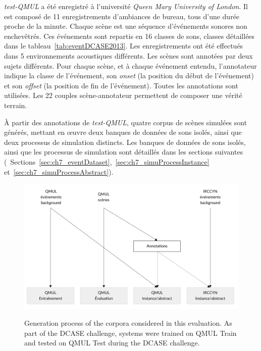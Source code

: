 \emph{test-QMUL} a été enregistré à l'université \emph{Queen Mary University of London}. Il est composé de 11 enregistrements d'ambiances de bureau, tous d'une durée proche de la minute. Chaque scène est une séquence d'événements sonores non enchevêtrés. Ces événements sont repartis en 16 classes de sons, classes détaillées dans le tableau~\ref{tab:eventDCASE2013}. Les enregistrements ont été effectués dans 5 environnements acoustiques différents. Les scènes sont annotées par deux sujets différents. Pour chaque scène, et à chaque événement entendu, l'annotateur indique la classe de l'événement, son \emph{onset} (la position du début de l'événement) et son \emph{offset} (la position de fin de l'événement). Toutes les annotations sont utilisées. Les 22 couples scène-annotateur permettent de composer une vérité terrain.

À partir des annotations de \emph{test-QMUL}, quatre corpus de scènes simulées sont générés, mettant en œuvre deux banques de données de sons isolés, ainsi que deux processus de simulation distincts. Les banques de données de sons isolés, ainsi que les processus de simulation sont détaillés dans les sections suivantes (\cf~Sections~\ref{sec:ch7_eventDataset},~\ref{sec:ch7_simuProcessInstance} et~\ref{sec:ch7_simuProcessAbstract}). 

\begin{figure}[t]
\begin{center}
\includegraphics[width=1\textwidth]{gfx/ch_7/databasesTasslp.pdf}
\label{fig:databasesDCASE2013Simu}
\caption{Generation process of the corpora considered in this evaluation. As part of the DCASE challenge, systems were trained on QMUL Train and tested on QMUL Test during the DCASE challenge.} 
\end{center}
\end{figure}

